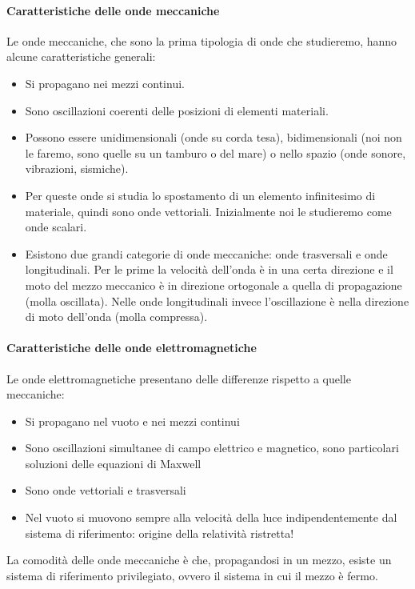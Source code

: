 \paragraph{Caratteristiche delle onde meccaniche} Le onde meccaniche, che sono la prima tipologia di onde che studieremo, hanno alcune caratteristiche generali:
\begin{itemize}
	
	\item Si propagano nei mezzi continui.
	\item Sono oscillazioni coerenti delle posizioni di elementi materiali.
	\item Possono essere unidimensionali (onde su corda tesa), bidimensionali (noi non le faremo, sono quelle su un tamburo o del mare) o nello spazio (onde sonore, vibrazioni, sismiche).
	\item Per queste onde si studia lo spostamento di un elemento infinitesimo di materiale, quindi sono onde vettoriali. Inizialmente noi le studieremo come onde scalari.
	\item Esistono due grandi categorie di onde meccaniche: onde trasversali e onde longitudinali. Per le prime la velocità dell'onda è in una certa direzione e il moto del mezzo meccanico è in direzione ortogonale a quella di propagazione (molla oscillata). Nelle onde longitudinali invece l'oscillazione è nella direzione di moto dell'onda (molla compressa).
\end{itemize}

\paragraph{Caratteristiche delle onde elettromagnetiche}
Le onde elettromagnetiche presentano delle differenze rispetto a quelle meccaniche:
\begin{itemize}
	
	\item Si propagano nel vuoto e nei mezzi continui
	\item Sono oscillazioni simultanee di campo elettrico e magnetico, sono particolari soluzioni delle equazioni di Maxwell
	\item Sono onde vettoriali e trasversali
	\item Nel vuoto si muovono sempre alla velocità della luce indipendentemente dal sistema di riferimento: origine della relatività ristretta!
\end{itemize}

La comodità delle onde meccaniche è che, propagandosi in un mezzo, esiste un sistema di riferimento privilegiato, ovvero il sistema in cui il mezzo è fermo.

